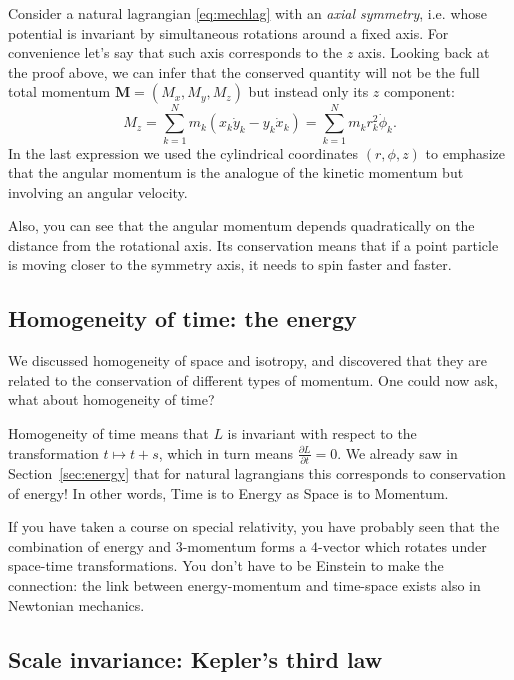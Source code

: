 \documentclass[english,fontsize=11pt,paper=a5,oneside]{scrbook}
\theoremstyle{definition}
\newenvironment{example}
  {\pushQED{\qed}\renewcommand{\qedsymbol}{$\lozenge$}\examplex}
  {\popQED\endexamplex}
\begin{document}
\begin{example}
    Consider a natural lagrangian \eqref{eq:mechlag} with an \emph{axial symmetry}, i.e. whose potential is invariant by simultaneous rotations around a fixed axis.
    For convenience let's say that such axis corresponds to the $z$ axis.
    Looking back at the proof above, we can infer that the conserved quantity will not be the full total momentum $\bm{M} = (M_x, M_y, M_z)$ but instead only its $z$ component:
    \begin{equation}
        M_z = \sum_{k=1}^N m_k\left(x_k \dot y_k - y_k \dot x_k\right) =
        \sum_{k=1}^N m_k r_k^2 \dot \phi_k.
    \end{equation}
    In the last expression we used the cylindrical coordinates $(r, \phi, z)$ to emphasize that the angular momentum is the analogue of the kinetic momentum but involving an angular velocity.

    Also, you can see that the angular momentum depends quadratically on the distance from the rotational axis. Its conservation means that if a point particle is moving closer to the symmetry axis, it needs to spin faster and faster.
\end{example}

\subsection{Homogeneity of time: the energy}

We discussed homogeneity of space and isotropy, and discovered that they are related to the conservation of different types of momentum.
One could now ask, what about homogeneity of time?

Homogeneity of time means that $L$ is invariant with respect to the transformation $t\mapsto t+s$, which in turn means $\frac{\partial L}{\partial t} = 0$. We already saw in Section~\ref{sec:energy} that for natural lagrangians this corresponds to conservation of energy! In other words, Time is to Energy as Space is to Momentum.

If you have taken a course on special relativity, you have probably seen that the combination of energy and $3$-momentum forms a $4$-vector which rotates under space-time transformations. You don't have to be Einstein to make the connection: the link between energy-momentum and time-space exists also in Newtonian mechanics.

\subsection{Scale invariance: Kepler's third law}
\end{document}
